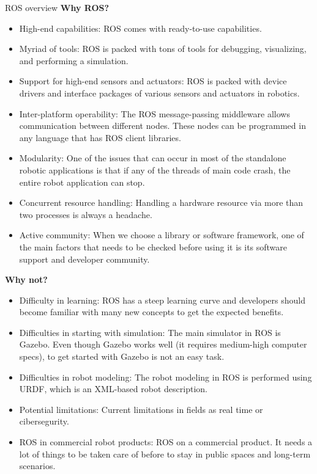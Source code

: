 \begin{frame}[allowframebreaks]{ROS overview}
  \framebreak
 \textbf{Why ROS?}
 \begin{itemize}
			\item High-end capabilities: ROS comes with ready-to-use capabilities.
			\item Myriad of tools: ROS is packed with tons of tools for debugging, visualizing, and
			performing a simulation.
			\item Support for high-end sensors and actuators: ROS is packed with device drivers
			and interface packages of various sensors and actuators in robotics.
			\item Inter-platform operability: The ROS message-passing middleware allows
			communication between different nodes. These nodes can be programmed in any
			language that has ROS client libraries.
			\item Modularity: One of the issues that can occur in most of the standalone robotic
			applications is that if any of the threads of main code crash, the entire robot
			application can stop.
			\item Concurrent resource handling: Handling a hardware resource via more than two
			processes is always a headache.
			\item Active community: When we choose a library or software framework,  one of the main factors that needs to be checked before using it is its software support and developer community.
 \end{itemize}
 
 \framebreak
 
 \textbf{Why not?}
		\begin{itemize}
			\item Difficulty in learning:  ROS   has a steep learning curve and developers should become familiar with many new concepts to get the expected benefits.
			\item Difficulties in starting with simulation: The main simulator in ROS is Gazebo.
			Even though Gazebo works well (it requires medium-high computer specs), to get started with Gazebo is not an easy task.
			\item Difficulties in robot modeling: The robot modeling in ROS is performed using
			URDF, which is an XML-based robot description. 
			\item Potential limitations: Current limitations in fields as real time or cibersegurity. 
			\item ROS in commercial robot products:  ROS on a commercial
			product. It needs a lot of things to be taken care of before to stay in public spaces and  long-term scenarios.
		\end{itemize}
  

\end{frame}
